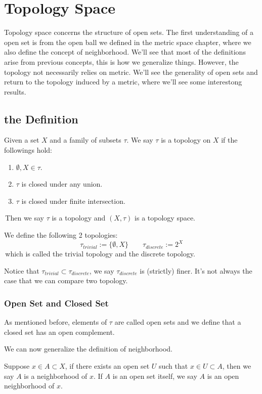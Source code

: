 \chapter{Topology Space}
Topology space concerns the structure of open sets. The first understanding of a open set is from the open ball we defined in the metric space chapter, where we also define the concept of neighborhood.
We'll see that most of the definitions arise from previous concepts, this is how we generalize things.
However, the topology not necessarily relies on metric. We'll see the generality of open sets and return to the topology induced by a metric, where we'll see some interestong results.

\section{the Definition}
\begin{definition}[Topology]
    Given a set $X$ and a family of subsets $\tau$. We say $\tau$ is a topology on $X$ if the followings hold:
    \begin{enumerate}
        \item $\emptyset, X \in \tau$.
        \item $\tau$ is closed under any union.
        \item $\tau$ is closed under finite intersection.
    \end{enumerate}
    \,Then we say $\tau$ is a topology and $(X,\tau)$ is a topology space.
\end{definition}

\begin{example}
    We define the following 2 topologies:
    $$\tau_{trivial}:= \{\emptyset, X\} \qquad \tau_{discrete} := 2^{X}$$
    \,which is called the trivial topology and the discrete topology.
\end{example}

Notice that $\tau_{trivial} \subset \tau_{discrete}$, we say $\tau_{discrete}$ is (strictly) finer. It's not always the case that we can compare two topology.

\subsection{Open Set and Closed Set}
As mentioned before, elements of $\tau$ are called open sets and we define that a closed set has an open complement.

We can now generalize the definition of neighborhood.
\begin{definition}[Neighborhood]
    Suppose $x\in A \subset X$, if there exists an open set $U$ such that $x\in U\subset A$, then we say $A$ is a neighborhood of $x$. If $A$ is an open set itself, we say $A$ is an open neighborhood of $x$.
\end{definition}

